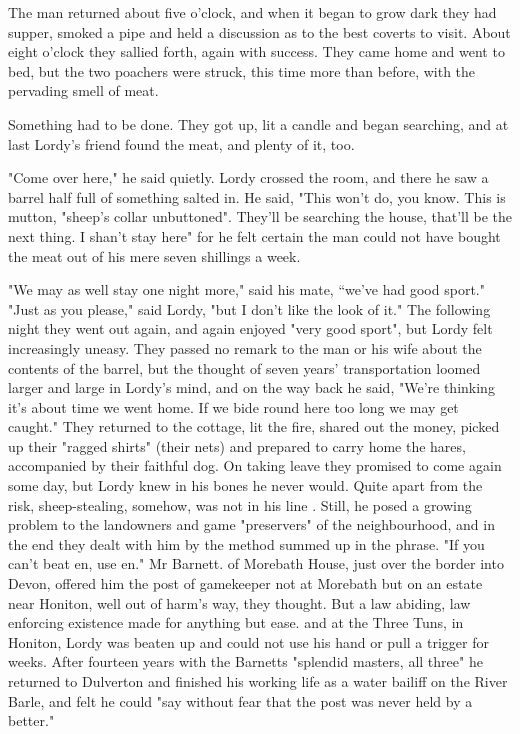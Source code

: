 The man returned about five o'clock, and when it began to grow dark they had supper, smoked a pipe and held a discussion as to the best coverts to visit. About eight o'clock they sallied forth, again with success. They came home and went to bed, but the two poachers were struck, this time more than before, with the pervading smell of meat.

Something had to be done. They got up, lit a candle and began searching, and at last Lordy's friend found the meat, and plenty of it, too.

"Come over here," he said quietly. Lordy crossed the room, and there he saw a barrel half full of something salted in. He said, "This won't do, you know. This is mutton, "sheep's collar unbuttoned". They'll be searching the house, that'll be the next thing. I shan't stay here"   for he felt certain the man could not have bought the meat out of his mere seven shillings a week.

"We may as well stay one night more," said his mate, “we’ve had good sport." 
 "Just as you please," said Lordy, "but I don't like the look of it."
 The following night they went out again, and again enjoyed "very good sport", but Lordy felt increasingly uneasy. They passed no remark to the man or his wife about the contents of the barrel, but the thought of seven years' transportation loomed larger and large in Lordy's mind, and on the way back he said, "We're thinking it's about time we went home. If we bide round here too long we may get caught."
 They returned to the cottage, lit the fire, shared out the money, picked up their "ragged shirts" (their nets) and prepared to carry home the hares, accompanied by their faithful dog. On taking leave they promised to come again some day, but Lordy knew in his bones he never would. Quite apart from the risk, sheep-stealing, somehow, was not in his line . 
 Still, he posed a growing problem to the landowners and game "preservers" of the neighbourhood, and in the end they dealt with him by the method summed up in the phrase. "If you can't beat en, use en." Mr Barnett. of Morebath House, just over the border into Devon, offered him the post of gamekeeper   not at Morebath but on an estate near Honiton, well out of harm's way, they thought. But a law abiding, law enforcing existence made for anything but ease. and at the Three Tuns, in Honiton, Lordy was beaten up and could not use his hand or pull a trigger for weeks. After fourteen years with the Barnetts   "splendid masters, all three"   he returned to Dulverton and finished his working life as a water bailiff on the River Barle, and felt he could "say without fear that the post was never held by a better."
	 